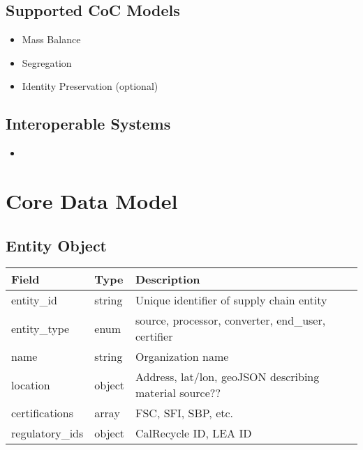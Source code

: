 \documentclass{article}
\begin{document}
\subsection*{Supported CoC Models}
\begin{itemize}[noitemsep]
    \item Mass Balance
    \item Segregation
    \item Identity Preservation (optional)
\end{itemize}

\subsection*{Interoperable Systems}
\begin{itemize}[noitemsep]
    \item 
\end{itemize}

\section{Core Data Model}

\subsection*{Entity Object}
\begin{longtable}{|p{3cm}|p{3cm}|p{8cm}|}
\hline
\textbf{Field} & \textbf{Type} & \textbf{Description} \\
\hline
entity\_id & string & Unique identifier of supply chain entity \\
entity\_type & enum & source, processor, converter, end\_user, certifier \\
name & string & Organization name \\
location & object & Address, lat/lon, geoJSON describing material source?? \\
certifications & array & FSC, SFI, SBP, etc. \\
regulatory\_ids & object & CalRecycle ID, LEA ID \\
\hline
\end{longtable}
\end{document}
